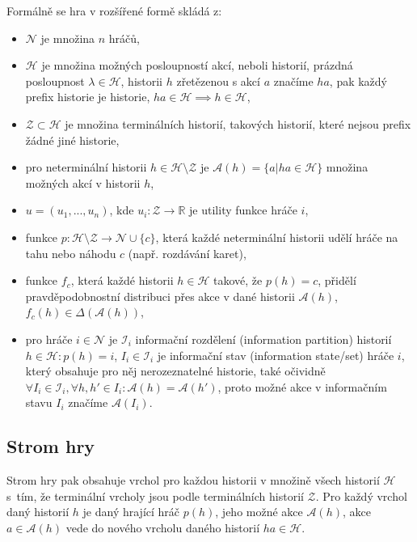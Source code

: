 Formálně se hra v rozšířené formě skládá z:
\begin{itemize}
  \item $\mathcal{N}$ je množina $n$ hráčů,
  \item $\mathcal{H}$ je množina možných posloupností akcí, neboli historií, prázdná posloupnost $\lambda \in \mathcal{H}$, historii $h$ zřetězenou s akcí $a$ značíme $ha$, pak každý prefix historie je historie, $ha \in \mathcal{H} \implies h \in \mathcal{H}$,
  \item $\mathcal{Z} \subset \mathcal{H}$ je množina terminálních historií, takových historií, které nejsou prefix žádné jiné historie,
  \item pro neterminální historii $h \in \mathcal{H} \setminus \mathcal{Z}$ je $\mathcal{A}(h) = \{a | ha \in \mathcal{H}\}$ množina možných akcí v historii $h$,
  \item $u = (u_1, ..., u_n)$, kde $u_i: \mathcal{Z} \to \mathbb{R}$ je utility funkce hráče $i$,
  \item funkce $p: \mathcal{H} \setminus \mathcal{Z} \to \mathcal{N} \cup \{c\}$, která každé neterminální historii udělí hráče na tahu nebo náhodu $c$ (např. rozdávání karet),
  \item funkce $f_c$, která každé historii $h \in \mathcal{H}$ takové, že $p(h) = c$, přidělí pravděpodobnostní distribuci přes akce v dané historii $\mathcal{A}(h)$, $f_c(h) \in \Delta(\mathcal{A}(h))$,
  \item pro hráče $i \in \mathcal{N}$ je $\mathcal{I}_i$ informační rozdělení (information partition) historií $h \in \mathcal{H}: p(h) = i$, $I_i \in \mathcal{I}_i$ je informační stav (information state/set) hráče $i$, který obsahuje pro něj nerozeznatelné historie, také očividně $\forall I_i \in \mathcal{I}_i, \forall h,h' \in I_i: \mathcal{A}(h) = \mathcal{A}(h')$, proto možné akce v informačním stavu $I_i$ značíme $\mathcal{A}(I_i)$. \cite{RegretInImperfectInformation}
  
\end{itemize}

\subsection{Strom hry}

Strom hry pak obsahuje vrchol pro každou historii v množině všech historií $\mathcal{H}$ s~tím, že terminální vrcholy jsou podle terminálních historií $\mathcal{Z}$. Pro každý vrchol daný historií $h$ je daný hrající hráč $p(h)$, jeho možné akce $\mathcal{A}(h)$, akce $a \in \mathcal{A}(h)$ vede do nového vrcholu daného historií $ha \in \mathcal{H}$. 

